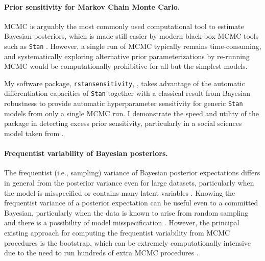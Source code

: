 \paragraph{Prior sensitivity for Markov Chain Monte Carlo.}

MCMC is arguably the most commonly used computational tool to estimate Bayesian
posteriors, which is made still easier by modern black-box MCMC tools such as
\texttt{Stan} \citep{carpenter:2017:stan, rstan}.  However, a single run of MCMC
typically remains time-consuming, and systematically exploring alternative prior
parameterizations by re-running MCMC would be computationally prohibitive for
all but the simplest models.

My software package, \texttt{rstansensitivity},
\citep{giordano:2020:rstansensitivity, giordano:2018:mcmchyper}, takes advantage
of the automatic differentiation capacities of \texttt{Stan}
\citep{carpenter:2015:stanmath} together with a classical result from  Bayesian
robustness \citep{gustafson:1996:localposterior, basu:1996:local,
giordano:2018:covariances} to provide automatic hyperparameter sensitivity for
generic \texttt{Stan} models from only a single MCMC run.  I demonstrate the
speed and utility of the package in detecting excess prior sensitivity,
particularly in a social sciences model taken from \citet[Chapter
13.5]{gelman:2006:arm}.


\paragraph{Frequentist variability of Bayesian posteriors.}

The frequentist (i.e., sampling) variance of Bayesian posterior expectations
differs in general from the posterior variance even for large datasets,
particularly when the model is misspecified or contains many latent variables
\citep{kleijn:2006:misspecification}.
Knowing the frequentist variance of a posterior expectation can be useful even
to a committed Bayesian, particularly when the data is known to arise from
random sampling and there is a possibility of model misspecification
\citep{waddell:2002:bayesphyloboot}.  However, the
principal existing approach for computing the frequentist variability from MCMC
procedures is the bootstrap, which can be extremely computationally intensive
due to the need to run hundreds of extra MCMC procedures
\citep{huggins:2019:bayesbag}.

